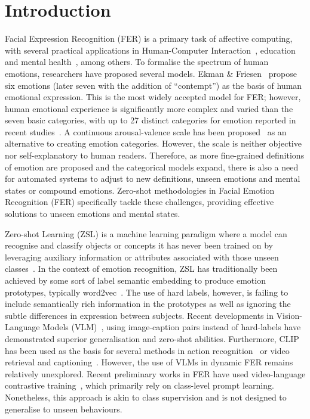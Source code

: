 \documentclass[10pt,twocolumn,letterpaper]{article}
\begin{document}
\section{Introduction}
\label{sec:intro}
Facial Expression Recognition (FER) is a primary task of affective computing, with several practical applications in Human-Computer Interaction~\cite{chowdary2021deep}, education~\cite{YADEGARIDEHKORDI2019103649} and mental health~\cite{foteinopoulou_learning_2022}, among others. To formalise the spectrum of human emotions, researchers have proposed several models. Ekman \& Friesen~\cite{ekman_facial_1978} propose six emotions (later seven with the addition of ``contempt'') as the basis of human emotional expression. This is the most widely accepted model for FER; however, human emotional experience is significantly more complex and varied than the seven basic categories, with up to 27 distinct categories for emotion reported in recent studies~\cite{cowen_self-report_2017}. A continuous arousal-valence scale has been proposed~\cite{russell_circumplex_1980} as an alternative to creating emotion categories. However, the scale is neither objective~\cite{foteinopoulou_estimating_2021} nor self-explanatory to human readers. Therefore, as more fine-grained definitions of emotion are proposed and the categorical models expand, there is also a need for automated systems to adjust to new definitions, unseen emotions and mental states or compound emotions. Zero-shot methodologies in Facial Emotion Recognition (FER) specifically tackle these challenges, providing effective solutions to unseen emotions and mental states.

Zero-shot Learning (ZSL) is a machine learning paradigm where a model can recognise and classify objects or concepts it has never been trained on by leveraging auxiliary information or attributes associated with those unseen classes~\cite{xian2018zero}. In the context of emotion recognition, ZSL has traditionally been achieved by some sort of label semantic embedding to produce emotion prototypes, typically word2vec~\cite{zhan_zero-shot_2019, banerjee_learning_2022}. The use of hard labels, however, is failing to include semantically rich information in the prototypes as well as ignoring the subtle differences in expression between subjects. Recent developments in Vision-Language Models (VLM)~\cite{radford_CLIP_2021, jia2021align, alayrac2022flamingo}, using image-caption pairs instead of hard-labels have demonstrated superior generalisation and zero-shot abilities. Furthermore, CLIP~\cite{radford_CLIP_2021} has been used as the basis for several methods in action recognition~\cite{zara_autolabel_2023, wang_actionclip_2021} or video retrieval and captioning~\cite{tang_clip4caption_2021, ma_x-clip_2022, yang_vid2seq_2023, luo_clip4clip_2022}. However, the use of VLMs in dynamic FER remains relatively unexplored. Recent preliminary works in FER have used video-language contrastive training~\cite{li_cliper_2023, li_fer-former_2023}, which primarily rely on class-level prompt learning. Nonetheless, this approach is akin to class supervision and is not designed to generalise to unseen behaviours. 
\end{document}
